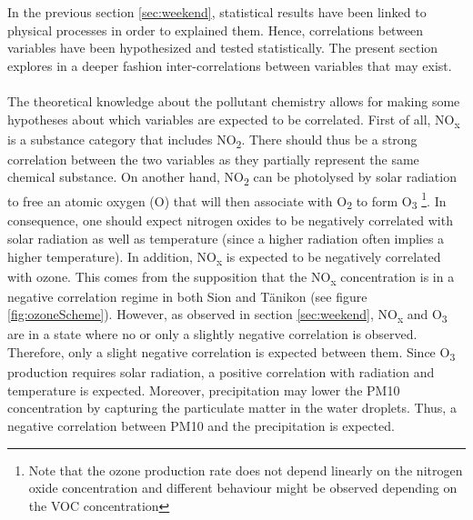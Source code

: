 \documentclass[a4paper, 12pt]{article}
\begin{document}
    In the previous section \ref{sec:weekend}, statistical results have been linked to  physical processes in order to explained them. Hence, correlations between variables have been hypothesized and tested statistically. The present section explores in a deeper fashion inter-correlations between variables that may exist.
    \\
    \\
    The theoretical knowledge about the pollutant chemistry allows for making some hypotheses about which variables are expected to be correlated. First of all, NO\textsubscript{x} is a substance category that includes NO\textsubscript{2}. There should thus be a strong correlation between the two variables as they partially represent the same chemical substance. On another hand, NO\textsubscript{2} can be photolysed by solar radiation to free an atomic oxygen (O) that will then associate with O\textsubscript{2} to form O\textsubscript{3} \footnote{Note that the ozone production rate does not depend linearly on the nitrogen oxide concentration and different behaviour might be observed depending on the VOC concentration}. In consequence, one should expect nitrogen oxides to be negatively correlated with solar radiation as well as temperature (since a higher radiation often implies a higher temperature). In addition, NO\textsubscript{x} is expected to be negatively correlated with ozone. This comes from the supposition that the NO\textsubscript{x} concentration is in a negative correlation regime in both Sion and Tänikon (see figure \ref{fig:ozoneScheme}). However, as observed in section \ref{sec:weekend}, NO\textsubscript{x} and O\textsubscript{3} are in a state where no or only a slightly negative correlation is observed. Therefore, only a slight negative correlation is expected between them. Since O\textsubscript{3} production requires solar radiation, a positive correlation with radiation and temperature is expected. Moreover, precipitation may lower the PM10 concentration by capturing the particulate matter in the water droplets. Thus, a negative correlation between PM10 and the precipitation is expected. 
    
\end{document}
